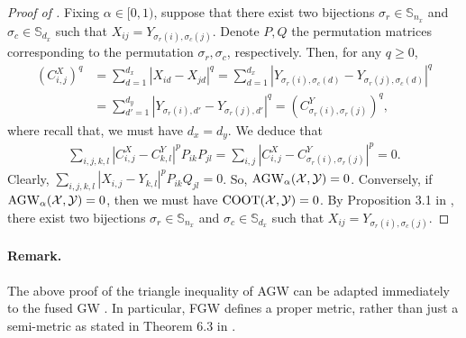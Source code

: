 \begin{proof}[Proof of ]
      Fixing $\alpha \in [0,1)$, suppose that there exist two bijections
      $\sigma_r \in \mathbb S_{n_x}$ and $\sigma_c \in \mathbb S_{d_x}$ such that
      $X_{ij} = Y_{\sigma_r(i), \sigma_c(j)}$. Denote $P, Q$ the permutation matrices
      corresponding to the permutation $\sigma_r, \sigma_c$, respectively.
      Then, for any $q \geq 0$,
      \begin{align}
        (C^X_{i,j})^q &= \sum_{d = 1}^{d_x} |X_{id} - X_{jd}|^q
        = \sum_{d = 1}^{d_x} |Y_{\sigma_r(i), \sigma_c(d)} - Y_{\sigma_r(j), \sigma_c(d)}|^q \\
        &= \sum_{d' = 1}^{d_y} |Y_{\sigma_r(i), d'} - Y_{\sigma_r(j), d'}|^q
        = (C^Y_{\sigma_r(i), \sigma_r(j)})^q,
      \end{align}
      where recall that, we must have $d_x = d_y$. We deduce that
      \begin{align}
        \sum_{i,j,k,l} |C^X_{i,j} - C^Y_{k,l}|^p P_{ik} P_{jl} =
        \sum_{i,j} |C^X_{i,j} - C^Y_{\sigma_r(i), \sigma_r(j)}|^p = 0.
      \end{align}
      Clearly, $\sum_{i,j,k,l} |X_{i,j} - Y_{k,l}|^p P_{ik} Q_{jl} = 0$.
      So, $\text{AGW}_{\alpha}(\mathcal X, \mathcal Y) = 0$. Conversely,
      if $\text{AGW}_{\alpha}(\mathcal X, \mathcal Y) = 0$, then we must have $\text{COOT}(\mathcal X, \mathcal Y) = 0$.
      By Proposition 3.1 in \citep{Redko20}, there exist two bijections
      $\sigma_r \in \mathbb S_{n_x}$ and $\sigma_c \in \mathbb S_{d_x}$ such that
      $X_{ij} = Y_{\sigma_r(i), \sigma_c(j)}$.
\end{proof}

\paragraph{Remark.} The above proof of the triangle inequality of AGW can be
adapted immediately to the fused GW \citep{Vayer19b}. In particular, FGW
defines a proper metric, rather than just a semi-metric as stated in Theorem 6.3
in \citep{Vayer19b}.

